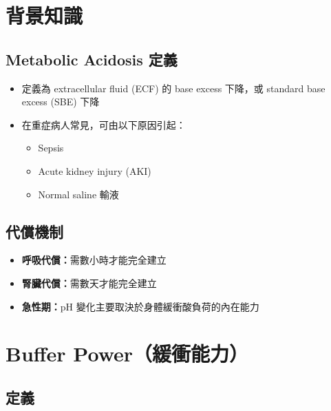 \documentclass[12pt,a4paper]{article}
\begin{document}
\section{背景知識}

\subsection{Metabolic Acidosis 定義}

\begin{itemize}
    \item 定義為 extracellular fluid (ECF) 的 base excess 下降，或 standard base excess (SBE) 下降
    \item 在重症病人常見，可由以下原因引起：
    \begin{itemize}
        \item Sepsis
        \item Acute kidney injury (AKI)
        \item Normal saline 輸液
    \end{itemize}
\end{itemize}

\subsection{代償機制}

\begin{itemize}
    \item \textbf{呼吸代償：}需數小時才能完全建立
    \item \textbf{腎臟代償：}需數天才能完全建立
    \item \textbf{急性期：}pH 變化主要取決於身體緩衝酸負荷的內在能力
\end{itemize}

\section{Buffer Power（緩衝能力）}

\subsection{定義}

\end{document}
